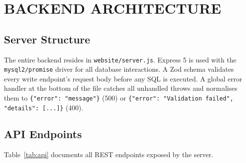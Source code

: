 \documentclass[12pt,a4paper]{article}
\begin{document}
\section{BACKEND ARCHITECTURE}

\subsection{Server Structure}

The entire backend resides in \texttt{website/server.js}. Express 5 is used with the
\texttt{mysql2/promise} driver for all database interactions. A Zod schema validates every
write endpoint's request body before any SQL is executed. A global error handler at the bottom
of the file catches all unhandled throws and normalises them to
\texttt{\{"error": "message"\}} (500) or \texttt{\{"error": "Validation failed", "details":
[...]\}} (400).

\subsection{API Endpoints}

Table~\ref{tab:api} documents all REST endpoints exposed by the server.
\end{document}

